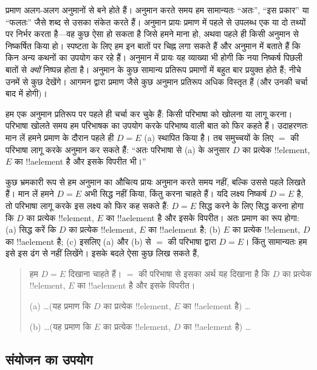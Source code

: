 \documentclass[../../../include/open-logic-section]{subfiles}
\begin{document}


प्रमाण अलग-अलग अनुमानों से बने होते हैं। अनुमान करते समय हम सामान्यतः
``अतः'', ``इस प्रकार'' या ``फलतः'' जैसे शब्द से उसका संकेत करते हैं। अनुमान
प्रायः प्रमाण में पहले से उपलब्ध एक या दो तथ्यों पर निर्भर करता है---वह कुछ
ऐसा हो सकता है जिसे हमने माना हो, अथवा पहले ही किसी अनुमान से निष्कर्षित
किया हो। स्पष्टता के लिए हम इन बातों पर चिह्न लगा सकते हैं और अनुमान में
बताते हैं कि किन अन्य कथनों का उपयोग कर रहे हैं। अनुमान में प्रायः यह
व्याख्या भी होगी कि नया निष्कर्ष पिछली बातों से \emph{क्यों} निष्पन्न होता
है। अनुमान के कुछ सामान्य प्रतिरूप प्रमाणों में बहुत बार प्रयुक्त होते हैं;
नीचे उनमें से कुछ देखेंगे। आगमन द्वारा प्रमाण जैसे कुछ अनुमान प्रतिरूप अधिक
विस्तृत हैं (और उनकी चर्चा बाद में होगी)।

हम एक अनुमान प्रतिरूप पर पहले ही चर्चा कर चुके हैं: किसी परिभाषा को खोलना
या लागू करना। परिभाषा खोलते समय हम परिभाषक का उपयोग करके परिभाष्य वाली बात
को फिर कहते हैं। उदाहरणतः मान लें हमने प्रमाण के दौरान पहले ही $D=E$ (a)
स्थापित किया है। तब समुच्चयों के लिए $=$ की परिभाषा लागू करके अनुमान कर सकते
हैं: ``अतः परिभाषा से (a) के अनुसार $D$ का प्रत्येक !!{element}, $E$ का
!!a{element} है और इसके विपरीत भी।''

कुछ भ्रमकारी रूप से हम अनुमान का औचित्य प्रायः अनुमान करते समय नहीं, बल्कि
उससे पहले लिखते हैं। मान लें हमने $D=E$ अभी सिद्ध नहीं किया, किंतु करना
चाहते हैं। यदि लक्ष्य निष्कर्ष $D=E$ है, तो परिभाषा लागू करके इस लक्ष्य को
फिर कह सकते हैं: $D=E$ सिद्ध करने के लिए सिद्ध करना होगा कि $D$ का प्रत्येक
!!{element}, $E$ का !!a{element} है और इसके विपरीत। अतः प्रमाण का रूप होगा:
(a) सिद्ध करें कि $D$ का प्रत्येक !!{element}, $E$ का !!a{element} है;
(b) $E$ का प्रत्येक !!{element}, $D$ का !!a{element} है; (c) इसलिए (a) और
(b) से $=$ की परिभाषा द्वारा $D=E$। किंतु सामान्यतः हम इसे इस ढंग से नहीं
लिखेंगे। इसके बदले ऐसा कुछ लिख सकते हैं,
\begin{quote}
हम $D=E$ दिखाना चाहते हैं। $=$ की परिभाषा से इसका अर्थ यह दिखाना है कि
$D$ का प्रत्येक !!{element}, $E$ का !!a{element} है और इसके विपरीत।

(a) \dots (यह प्रमाण कि $D$ का प्रत्येक !!{element}, $E$ का
!!a{element} है) \dots

(b) \dots (यह प्रमाण कि $E$ का प्रत्येक !!{element}, $D$ का
!!a{element} है) \dots
\end{quote}

\subsection{संयोजन का उपयोग}
\end{document}
